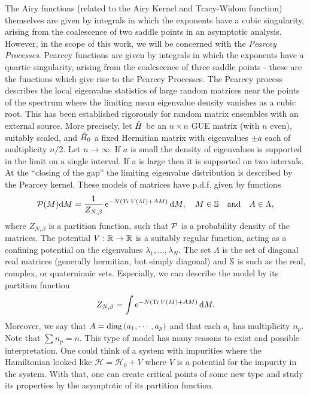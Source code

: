 The Airy functions (related to the Airy Kernel and Tracy-Widom function) themselves are given by integrals in which the exponents have a cubic singularity, arising from the coalescence of two saddle points in an asymptotic analysis. However, in the scope of this work, we will be concerned with the \textit{Pearcey Processes}. Pearcey functions are given by integrals in which the exponents have a quartic singularity, arising from the coalescence of three saddle points - these are the functions which give rise to the Pearcey Processes. The Pearcey process describes the local eigenvalue statistics of large random matrices near the points of the spectrum where the limiting mean eigenvalue density vanishes as a cubic root. This has been established rigorously for random matrix ensembles with an external source. More precisely, let $\hat H$ be an $n \times n$ GUE matrix (with $n$ even), suitably scaled, and $\hat H_0$ a fixed Hermitian matrix with eigenvalues $\pm a$ each of multiplicity $n/2$. Let $n \rightarrow \infty$. If $a$ is small the density of eigenvalues is supported in the limit on a single interval. If a is large then it is supported on two intervals. At the “closing of the gap” the limiting eigenvalue distribution is described by the Pearcey kernel. These models of matrices have p.d.f. given by functions 
\begin{equation}
	\mathcal{P}(M) \mathrm{d} M = \frac{1}{Z_{N, \beta}} \operatorname{e}^{- N \left( \operatorname{Tr}{V(M)} + AM \right)} \mathrm{d} M,\quad  M \in \mathbb{S}  \quad \text{and} \quad A \in \Lambda,
	\label{Equation: external source measure}
\end{equation}
where $Z_{N, \beta}$ is a partition function, such that $\mathcal{P}$ is a probability density of the matrices. The potential $V:\mathbb {\mathbb{R}} \to \mathbb{R}$ is a suitably regular function, acting as a confining potential on the eigenvalues $\lambda_1,\hdots, \lambda_N$. The set $\Lambda$ is the set of diagonal real matrices (generally hermitian, but simply diagonal) and $\mathbb{S}$ is such as the real, complex, or quaternionic sets.  Especially, we can describe the model by its partition function
\begin{equation}
	Z_{N, \beta} = \int \operatorname{e}^{- N \left( \operatorname{Tr}{V(M)} + AM \right)} \mathrm{d} M.
	\label{Equation: Partition Function for External Field}
\end{equation}
Moreover, we say that $A = \operatorname{diag}{(a_1, \cdots, a_p)}$ and that each $a_i$ has multiplicity $n_p$. Note that $\sum n_p = n$.  This type of model has many reasons to exist and possible interpretation. One could think of a system with impurities where the Hamiltonian looked like $\mathcal{H}= \mathcal{H}_0 + V$ where $V$ is a potential for the impurity in the system. With that, one can create critical points of some new type and study its properties by the asymptotic of its partition function. 

